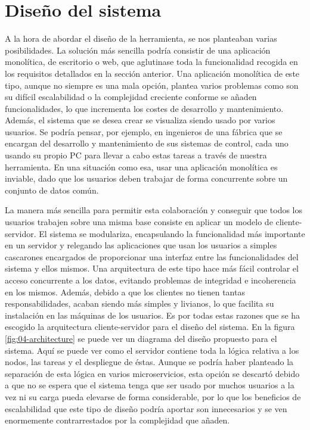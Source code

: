 \section{Diseño del sistema}
\label{sec:04-system_design}

A la hora de abordar el diseño de la herramienta, se nos planteaban varias
posibilidades. La solución más sencilla podría consistir de una aplicación
monolítica, de escritorio o web, que aglutinase toda la funcionalidad recogida
en los requisitos detallados en la sección anterior. Una aplicación monolítica
de este tipo, aunque no siempre es una mala opción, plantea varios problemas
como son su difícil escalabilidad o la complejidad creciente conforme se añaden
funcionalidades, lo que incrementa los costes de desarrollo y mantenimiento.
Además, el sistema que se desea crear se visualiza siendo usado por varios
usuarios. Se podría pensar, por ejemplo, en ingenieros de una fábrica que se
encargan del desarrollo y mantenimiento de sus sistemas de control, cada uno
usando su propio PC para llevar a cabo estas tareas a través de nuestra
herramienta. En una situación como esa, usar una aplicación monolítica es
inviable, dado que los usuarios deben trabajar de forma concurrente sobre un
conjunto de datos común.

La manera más sencilla para permitir esta colaboración y conseguir que todos los
usuarios trabajen sobre una misma base consiste en aplicar un modelo de
cliente-servidor. El sistema se modulariza, encapsulando la funcionalidad más
importante en un servidor y relegando las aplicaciones que usan los usuarios a
simples cascarones encargados de proporcionar una interfaz entre las
funcionalidades del sistema y ellos mismos. Una arquitectura de este tipo hace
más fácil controlar el acceso concurrente a los datos, evitando problemas de
integridad e incoherencia en los mismos. Además, debido a que los clientes no
tienen tantas responsabilidades, acaban siendo más simples y livianos, lo que
facilita su instalación en las máquinas de los usuarios. Es por todas estas
razones que se ha escogido la arquitectura cliente-servidor para el diseño del
sistema. En la figura \ref{fig:04-architecture} se puede ver un diagrama del
diseño propuesto para el sistema. Aquí se puede ver como el servidor contiene
toda la lógica relativa a los nodos, las tareas y el despliegue de éstas. Aunque
se podría haber planteado la separación de esta lógica en varios microservicios,
esta opción se descartó debido a que no se espera que el sistema tenga que ser
usado por muchos usuarios a la vez ni su carga pueda elevarse de forma
considerable, por lo que los beneficios de escalabilidad que este tipo de diseño
podría aportar son innecesarios y se ven enormemente contrarrestados por la
complejidad que añaden.

